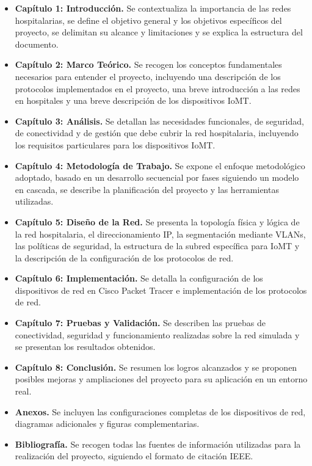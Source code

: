 \begin{itemize}
    \item \textbf{Capítulo 1: Introducción.} Se contextualiza la importancia de las redes hospitalarias, se define el objetivo general y los objetivos específicos del 
    proyecto, se delimitan su alcance y limitaciones y se explica la estructura del documento.
    \item \textbf{Capítulo 2: Marco Teórico.} Se recogen los conceptos fundamentales necesarios para entender el proyecto, incluyendo una descripción de los protocolos implementados 
    en el proyecto, una breve introducción a las redes en hospitales y una breve descripción de los dispositivos IoMT.
    \item \textbf{Capítulo 3: Análisis.} Se detallan las necesidades funcionales, de seguridad, de conectividad y de gestión que debe cubrir la red hospitalaria, 
    incluyendo los requisitos particulares para los dispositivos IoMT.
    \item \textbf{Capítulo 4: Metodología de Trabajo.} Se expone el enfoque metodológico adoptado, basado en un desarrollo secuencial por fases siguiendo un modelo en cascada, 
    se describe la planificación del proyecto y las herramientas utilizadas.
    \item \textbf{Capítulo 5: Diseño de la Red.} Se presenta la topología física y lógica de la red hospitalaria, el direccionamiento IP, la segmentación mediante VLANs, las 
    políticas de seguridad, la estructura de la subred específica para IoMT y la descripción de la configuración de los protocolos de red.
    \item \textbf{Capítulo 6: Implementación.} Se detalla la configuración de los dispositivos de red en Cisco Packet Tracer e implementación de los protocolos de red.
    \item \textbf{Capítulo 7: Pruebas y Validación.} Se describen las pruebas de conectividad, seguridad y funcionamiento realizadas sobre la red simulada y se presentan los 
    resultados obtenidos.
    \item \textbf{Capítulo 8: Conclusión.} Se resumen los logros alcanzados y se proponen posibles mejoras y ampliaciones del 
    proyecto para su aplicación en un entorno real.
    \item \textbf{Anexos.} Se incluyen las configuraciones completas de los dispositivos de red, diagramas adicionales y figuras complementarias.
    \item \textbf{Bibliografía.} Se recogen todas las fuentes de información utilizadas para la realización del proyecto, siguiendo el formato de citación \ac{IEEE}.
\end{itemize}
